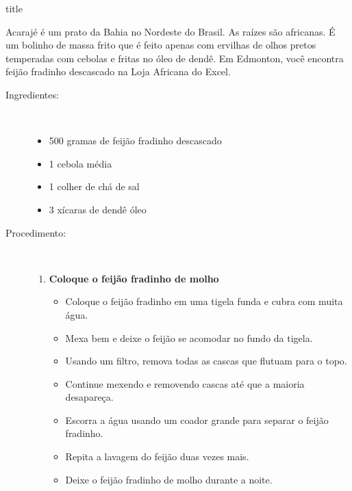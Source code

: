 \documentclass [11pt, letterpaper] {article}
\begin{document}
 {title}

Acaraj\'e é um prato da Bahia no Nordeste do Brasil. As raízes são africanas. É um bolinho de massa frito que é feito apenas com ervilhas de olhos pretos temperadas com cebolas e fritas no óleo de dend\^e. Em Edmonton, você encontra feij\~ao fradinho descascado na Loja Africana do Excel.

\vspace {0.3in}

\begin {description}

\item [Ingredientes:] \ \\
\begin {itemize}
\item 500 gramas de feij\~ao fradinho descascado
\item 1 cebola média
\item 1 colher de chá de sal
\item 3 xícaras de dend\^e óleo
\end {itemize}

\item [Procedimento:] \ \\

\begin {enumerate}
\item {\bf Coloque o feij\~ao fradinho de molho}
\begin {itemize}
\item Coloque o feij\~ao fradinho em uma tigela funda e cubra com muita água.
\item Mexa bem e deixe o feij\~ao se acomodar no fundo da tigela.
\item Usando um filtro, remova todas as cascas que flutuam para o topo.
\item Continue mexendo e removendo cascas até que a maioria desapareça.
\item Escorra a \'agua usando um coador grande para separar o feij\~ao fradinho.
\item Repita a lavagem do feij\~ao duas vezes mais.
\item Deixe o feij\~ao fradinho de molho durante a noite.
\end {itemize}


\end{enumerate}
\end{description}
\end{document}

